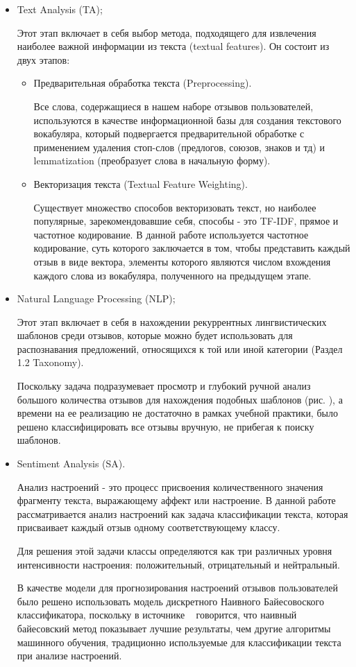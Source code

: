 \documentclass[a4paper,12pt]{article}
\begin{document}
	\begin{itemize}
		\item Text Analysis (TA);
		
		Этот этап включает в себя выбор метода, подходящего для извлечения наиболее важной информации из текста (textual features). Он состоит из двух этапов:
		
		\begin{itemize}
			\item Предварительная обработка текста (Preprocessing).
			
			Все слова, содержащиеся в нашем наборе отзывов пользователей, используются в качестве информационной базы для создания текстового вокабуляра, который подвергается предварительной обработке с применением удаления стоп-слов (предлогов, союзов, знаков и тд) и lemmatization (преобразует слова в начальную форму).
			
			\item Векторизация текста (Textual Feature Weighting).
			
			Существует множество способов векторизовать текст, но наиболее популярные, зарекомендовавшие себя, способы - это TF-IDF, прямое и частотное кодирование. В данной работе используется частотное кодирование, суть которого заключается в том, чтобы представить каждый отзыв в виде вектора, элементы которого являются числом вхождения каждого слова из вокабуляра, полученного на предыдущем этапе.
		\end{itemize}
		\item Natural Language Processing (NLP);
		
		Этот этап включает в себя в нахождении рекуррентных лингвистических шаблонов среди отзывов, которые можно будет использовать для распознавания предложений, относящихся к той или иной категории (Раздел 1.2 Taxonomy).
		
		Поскольку задача подразумевает просмотр и глубокий ручной анализ большого количества отзывов для нахождения подобных шаблонов (рис. ), а времени на ее реализацию не достаточно в рамках учебной практики, было решено классифицировать все отзывы вручную, не прибегая к поиску шаблонов.
		
		\item Sentiment Analysis (SA).
		
		Анализ настроений - это процесс присвоения количественного значения фрагменту текста, выражающему аффект или настроение. В данной работе рассматривается анализ настроений как задача классификации текста, которая присваивает каждый отзыв одному соответствующему классу. 
		
		Для решения этой задачи классы определяются как три различных уровня интенсивности настроения: положительный, отрицательный и нейтральный. 
		
		В качестве модели для прогнозирования настроений отзывов пользователей было решено использовать модель дискретного Наивного Байесовоского классификатора, поскольку в источнике ~\cite{university} говорится, что наивный байесовский метод показывает лучшие результаты, чем другие алгоритмы машинного обучения, традиционно используемые для классификации текста при анализе настроений.
	\end{itemize}
	
\end{document}
